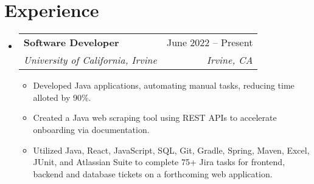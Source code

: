 \documentclass[letterpaper,11pt]{article}
\makeatletter
\newcommand{\resumeItem}[1]{
  \item\small{
    {#1 \vspace{-2pt}}
  }
}
\newcommand{\resumeSubheading}[4]{
  \vspace{-2pt}\item
    \begin{tabular*}{0.97\textwidth}[t]{l@{\extracolsep{\fill}}r}
      \textbf{#1} & #2 \\
      \textit{\small#3} & \textit{\small #4} \\
    \end{tabular*}\vspace{-7pt}
}
\newcommand{\resumeSubSubheading}[2]{
    \item
    \begin{tabular*}{0.97\textwidth}{l@{\extracolsep{\fill}}r}
      \textit{\small#1} & \textit{\small #2} \\
    \end{tabular*}\vspace{-7pt}
}
\newcommand{\resumeSubHeadingListStart}{\begin{itemize}[leftmargin=0.15in, label={}]}
\newcommand{\resumeSubHeadingListEnd}{\end{itemize}}
\newcommand{\resumeItemListStart}{\begin{itemize}}
\newcommand{\resumeItemListEnd}{\end{itemize}\vspace{-5pt}}
\makeatother
\begin{document}
\section{Experience}
  \resumeSubHeadingListStart

    \resumeSubheading
      {Software Developer}{June 2022 -- Present}
      {University of California, Irvine}{Irvine, CA}
      \resumeItemListStart
        \resumeItem{Developed Java applications, automating manual tasks, reducing time alloted by 90\%.}
        \resumeItem{Created a Java web scraping tool using REST APIs to accelerate onboarding via documentation.
        }
        \resumeItem{Utilized Java, React, JavaScript, SQL, Git, Gradle, Spring, Maven, Excel, JUnit, and Atlassian Suite to complete 75+ Jira tasks for frontend, backend and database tickets on a forthcoming web application. 
        }
      \resumeItemListEnd
      

  \resumeSubHeadingListEnd


\end{document}
